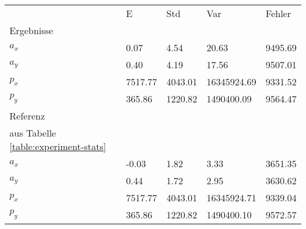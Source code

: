 \begin{tabular}{l|l|l|l|l}

     & E   & Std    & Var    & Fehler \\
\hhline{=|=|=|=|=}

Ergebnisse & & & & \\
$a_x$  &         0.07 &         4.54 &        20.63 &      9495.69 \\
$a_y$  &         0.40 &         4.19 &        17.56 &      9507.01 \\
$p_x$  &      7517.77 &      4043.01 &  16345924.69 &      9331.52 \\
$p_y$  &       365.86 &      1220.82 &   1490400.09 &      9564.47 \\

\hline
Referenz & & & & \\
aus Tabelle  \ref{table:experiment-stats} & & & & \\
$a_x$  &        -0.03 &         1.82 &         3.33 &      3651.35 \\
$a_y$  &         0.44 &         1.72 &         2.95 &      3630.62 \\
$p_x$  &      7517.77 &      4043.01 &  16345924.71 &      9339.04 \\
$p_y$  &       365.86 &      1220.82 &   1490400.10 &      9572.57 \\
\end{tabular}

